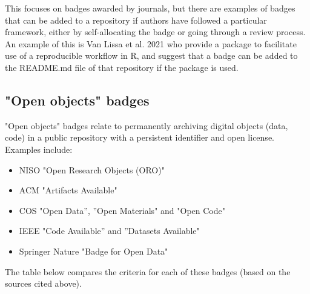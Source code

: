This focuses on badges awarded by journals, but there are examples of badges that can be added to a repository if authors have followed a particular framework, either by self-allocating the badge or going through a review process. An example of this is Van Lissa et al. 2021\autocite{van_lissa_worcs_2021} who provide a package to facilitate use of a reproducible workflow in R, and suggest that a badge can be added to the README.md file of that repository if the package is used.\autocite{van_lissa_worcs_2021}

\subsection{"Open objects" badges}

"Open objects" badges relate to permanently archiving digital objects (data, code) in a public repository with a persistent identifier and open license.\autocite{niso_reproducibility_badging_and_definitions_working_group_reproducibility_2021} Examples include:
\begin{itemize}
    \item NISO "Open Research Objects (ORO)"\autocite{niso_reproducibility_badging_and_definitions_working_group_reproducibility_2021}
    \item ACM "Artifacts Available"\autocite{association_for_computing_machinery_acm_artifact_2020}
    \item COS "Open Data”, ”Open Materials" and "Open Code"\autocite{blohowiak_badges_2023}
    \item IEEE "Code Available” and ”Datasets Available"\autocite{institute_of_electrical_and_electronics_engineers_ieee_about_nodate}
    \item Springer Nature "Badge for Open Data"\autocite{springer_nature_springer_2018}
\end{itemize}

The table below compares the criteria for each of these badges (based on the sources cited above).

